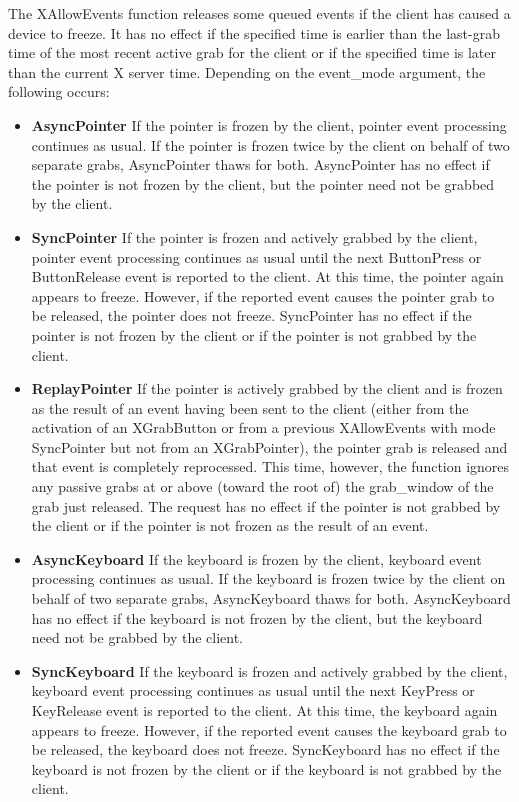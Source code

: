 \documentclass{report}
\begin{document}
\begin{itemize}
\begin{itemize}
            \end{itemize}
            The XAllowEvents function releases some queued events if the client has caused a device to freeze. It has no effect if the specified time is earlier than the last-grab time of the most recent active grab for the client or if the specified time is later than the current X server time. Depending on the event\_mode argument, the following occurs:
            \begin{itemize}
                \item \textbf{AsyncPointer} If the pointer is frozen by the client, pointer event processing continues as usual. If the pointer is frozen twice by the client on behalf of two separate grabs, AsyncPointer thaws for both. AsyncPointer has no effect if the pointer is not frozen by the client, but the pointer need not be grabbed by the client.
                \item \textbf{SyncPointer} If the pointer is frozen and actively grabbed by the client, pointer event processing continues as usual until the next ButtonPress or ButtonRelease event is reported to the client. At this time, the pointer again appears to freeze. However, if the reported event causes the pointer grab to be released, the pointer does not freeze. SyncPointer has no effect if the pointer is not frozen by the client or if the pointer is not grabbed by the client.
                \item \textbf{ReplayPointer} If the pointer is actively grabbed by the client and is frozen as the result of an event having been sent to the client (either from the activation of an XGrabButton or from a previous XAllowEvents with mode SyncPointer but not from an XGrabPointer), the pointer grab is released and that event is completely reprocessed. This time, however, the function ignores any passive grabs at or above (toward the root of) the grab\_window of the grab just released. The request has no effect if the pointer is not grabbed by the client or if the pointer is not frozen as the result of an event.
                \item \textbf{AsyncKeyboard} If the keyboard is frozen by the client, keyboard event processing continues as usual. If the keyboard is frozen twice by the client on behalf of two separate grabs, AsyncKeyboard thaws for both. AsyncKeyboard has no effect if the keyboard is not frozen by the client, but the keyboard need not be grabbed by the client.
                \item \textbf{SyncKeyboard} If the keyboard is frozen and actively grabbed by the client, keyboard event processing continues as usual until the next KeyPress or KeyRelease event is reported to the client. At this time, the keyboard again appears to freeze. However, if the reported event causes the keyboard grab to be released, the keyboard does not freeze. SyncKeyboard has no effect if the keyboard is not frozen by the client or if the keyboard is not grabbed by the client.

\end{itemize}
\end{itemize}
\end{document}
